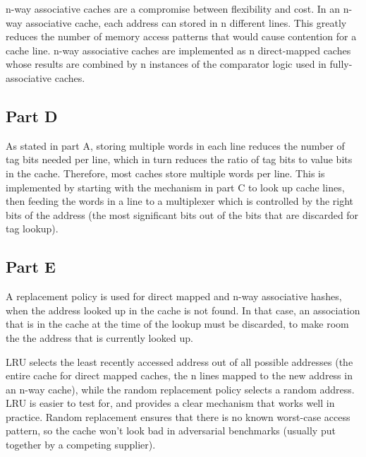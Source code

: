 n-way associative caches are a compromise between flexibility and cost. In an
n-way associative cache, each address can stored in n different lines. This
greatly reduces the number of memory access patterns that would cause
contention for a cache line. n-way associative caches are implemented as n
direct-mapped caches whose results are combined by n instances of the
comparator logic used in fully-associative caches.

\subsection{Part D}
As stated in part A, storing multiple words in each line reduces the number of
tag bits needed per line, which in turn reduces the ratio of tag bits to value
bits in the cache. Therefore, most caches store multiple words per line. This
is implemented by starting with the mechanism in part C to look up cache lines,
then feeding the words in a line to a multiplexer which is controlled by the
right bits of the address (the most significant bits out of the bits that are
discarded for tag lookup).

\subsection{Part E}
A replacement policy is used for direct mapped and n-way associative hashes,
when the address looked up in the cache is not found. In that case, an
association that is in the cache at the time of the lookup must be discarded,
to make room the the address that is currently looked up.

LRU selects the least recently accessed address out of all possible addresses
(the entire cache for direct mapped caches, the n lines mapped to the new
address in an n-way cache), while the random replacement policy selects a
random address. LRU is easier to test for, and provides a clear mechanism that
works well in practice. Random replacement ensures that there is no known
worst-case access pattern, so the cache won't look bad in adversarial
benchmarks (usually put together by a competing supplier).
